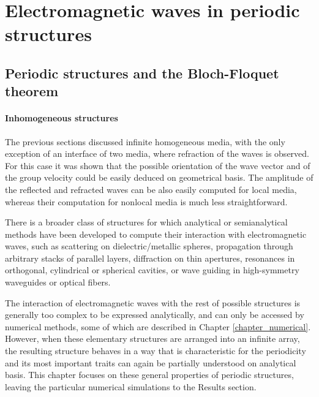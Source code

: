 
\section{Electromagnetic waves in periodic structures}
\subsection{Periodic structures and the Bloch-Floquet theorem}
\paragraph{Inhomogeneous structures}%
The previous sections discussed infinite homogeneous media, with the only exception of an interface of two media, where refraction of the waves is observed. For this case it was shown that the possible orientation of the wave vector and of the group velocity could be easily deduced on geometrical basis. The amplitude of the reflected and refracted waves can be also easily computed for local media, whereas their computation for nonlocal media is much less straightforward. 

There is a broader class of structures for which analytical or semianalytical methods have been developed to compute their interaction with electromagnetic waves, such as scattering on dielectric/metallic spheres, propagation through arbitrary stacks of parallel layers, diffraction on thin apertures, resonances in orthogonal, cylindrical or spherical cavities, or wave guiding in high-symmetry waveguides or optical fibers. 

The interaction of electromagnetic waves with the rest of possible structures is generally too complex to be expressed analytically, and can only be accessed by numerical methods, some of which are described in Chapter \ref{chapter_numerical}. However, when these elementary structures are arranged into an infinite array, the resulting structure behaves in a way that is characteristic for the periodicity and its most important traits can again be partially understood on analytical basis.
This chapter focuses on these general properties of periodic structures, leaving the particular numerical simulations to the Results section.

